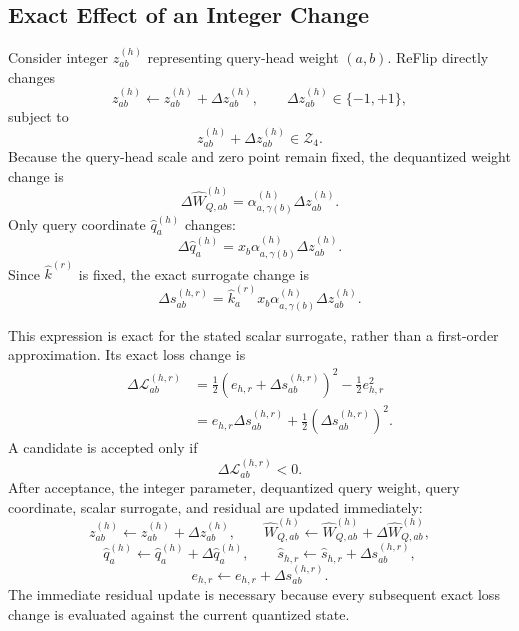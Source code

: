 \subsection{Exact Effect of an Integer Change}

Consider integer $z^{(h)}_{ab}$ representing query-head weight $(a,b)$. ReFlip directly changes
\begin{equation}
z^{(h)}_{ab}\leftarrow z^{(h)}_{ab}+\Delta z^{(h)}_{ab},
\qquad
\Delta z^{(h)}_{ab}\in\{-1,+1\},
\end{equation}
subject to
\begin{equation}
z^{(h)}_{ab}+\Delta z^{(h)}_{ab}\in\mathcal{Z}_4.
\end{equation}
Because the query-head scale and zero point remain fixed, the dequantized weight change is
\begin{equation}
\Delta\hat W^{(h)}_{Q,ab}
=\alpha^{(h)}_{a,\gamma(b)}\Delta z^{(h)}_{ab}.
\end{equation}
Only query coordinate $\hat q^{(h)}_a$ changes:
\begin{equation}
\Delta\hat q^{(h)}_a
=x_b\alpha^{(h)}_{a,\gamma(b)}\Delta z^{(h)}_{ab}.
\end{equation}
Since $\hat k^{(r)}$ is fixed, the exact surrogate change is
\begin{equation}
\Delta s^{(h,r)}_{ab}
=\hat k^{(r)}_a x_b
\alpha^{(h)}_{a,\gamma(b)}
\Delta z^{(h)}_{ab}.
\end{equation}

This expression is exact for the stated scalar surrogate, rather than a first-order approximation. Its exact loss change is
\begin{align}
\Delta\mathcal{L}^{(h,r)}_{ab}
&=
\frac{1}{2}
\left(e_{h,r}+\Delta s^{(h,r)}_{ab}\right)^2
-\frac{1}{2}e_{h,r}^2 \\
&=
e_{h,r}\Delta s^{(h,r)}_{ab}
+\frac{1}{2}\left(\Delta s^{(h,r)}_{ab}\right)^2.
\end{align}
A candidate is accepted only if
\begin{equation}
\Delta\mathcal{L}^{(h,r)}_{ab}<0.
\end{equation}
After acceptance, the integer parameter, dequantized query weight, query coordinate, scalar surrogate, and residual are updated immediately:
\begin{equation}
z^{(h)}_{ab}
\leftarrow
z^{(h)}_{ab}+\Delta z^{(h)}_{ab},
\qquad
\hat W^{(h)}_{Q,ab}
\leftarrow
\hat W^{(h)}_{Q,ab}+\Delta\hat W^{(h)}_{Q,ab},
\end{equation}
\begin{equation}
\hat q^{(h)}_a
\leftarrow
\hat q^{(h)}_a+\Delta\hat q^{(h)}_a,
\qquad
\hat{s}_{h,r}
\leftarrow
\hat{s}_{h,r}+\Delta s^{(h,r)}_{ab},
\end{equation}
\begin{equation}
e_{h,r}
\leftarrow
e_{h,r}+\Delta s^{(h,r)}_{ab}.
\end{equation}
The immediate residual update is necessary because every subsequent exact loss change is evaluated against the current quantized state.

